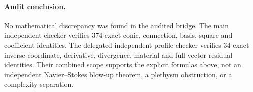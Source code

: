 \paragraph{Audit conclusion.}
No mathematical discrepancy was found in the audited bridge.
The main independent checker verifies 374 exact conic, connection,
basis, square and coefficient identities. The delegated independent
profile checker verifies 34 exact inverse-coordinate, derivative,
divergence, material and full vector-residual identities. Their
combined scope supports the explicit formulas above, not an
independent Navier--Stokes blow-up theorem, a plethysm obstruction,
or a complexity separation.

